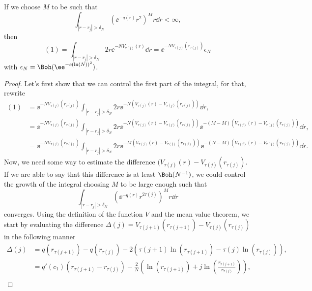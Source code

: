 \begin{lema}
	If we choose $M$ to be such that
	\begin{equation}
		\int_{|r - r_j| > \delta_N} \left( \ee^{-q(r)} r^{2} \right)^M r \dd r < \infty,
	\end{equation}
	then
	\begin{equation}
		(1) = \int_{|r - r_j| > \delta_N} 2r \ee^{-N V_{\tau(j)}(r)} \dd r = \ee^{-N V_{\tau(j)}(r_{\tau(j)})} \epsilon_N
	\end{equation}
	with $\epsilon_N = \Boh(\ee^{-c(\ln(N))^2})$.  
	\label{Lema: error annulus}
\end{lema}
\begin{proof}
	Let's first show that we can control the first part of the integral, for that, rewrite
	\begin{align}
		(1) & = \ee^{-N V_{\tau(j)}(r_{\tau(j)})} \int_{|r - r_j| > \delta_N} 2r \ee^{-N \left( V_{\tau(j)}(r) - V_{\tau(j)}(r_{\tau(j)}) \right)} \dd r, \\
		& = \ee^{-N V_{\tau(j)}(r_{\tau(j)})} \int_{|r - r_j| > \delta_N} 2r \ee^{-N \left( V_{\tau(j)}(r) - V_{\tau(j)}(r_{\tau(j)}) \right)}  \ee^{-(M-M) \left( V_{\tau(j)}(r) - V_{\tau(j)}(r_{\tau(j)}) \right)} \dd r, \\
		& = \ee^{-N V_{\tau(j)}(r_{\tau(j)})} \int_{|r - r_j| > \delta_N} 2r \ee^{-M \left( V_{\tau(j)}(r) - V_{\tau(j)}(r_{\tau(j)}) \right)}  \ee^{-(N-M) \left( V_{\tau(j)}(r) - V_{\tau(j)}(r_{\tau(j)}) \right)} \dd r.
	\end{align}
	Now, we need some way to estimate the difference $(V_{\tau(j)}(r) - V_{\tau(j)}(r_{\tau(j)})$. If we are able to say that this difference is at least $\Boh(N^{-1})$, we could control the growth of the integral choosing $M$ to be large enough such that
	\begin{equation}
		\int_{|r - r_j| > \delta_N} \left( \ee^{-q(r)} r^{2 \tau(j)} \right)^M r \dd r
	\end{equation}
	converges. Using the definition of the function $V$ and the mean value theorem, we start by evaluating the difference $\Delta(j) = V_{\tau(j+1)}(r_{\tau(j+1)}) - V_{\tau(j)}(r_{\tau(j)})$ in the following manner
	\begin{align}
		\Delta(j) &= q(r_{\tau(j+1)}) - q(r_{\tau(j)}) - 2 \left( \tau(j+1) \ln(r_{\tau(j+1)}) - \tau(j) \ln(r_{\tau(j)}) \right), \\
		& = q'(c_1) (r_{\tau(j+1)} - r_{\tau(j)}) - \frac{2}{N} \left(\ln(r_{\tau(j+1)})+j\ln\left(\frac{r_{\tau(j+1)}}{r_{\tau(j)}} \right) \right), \\

\end{align}
\end{proof}
